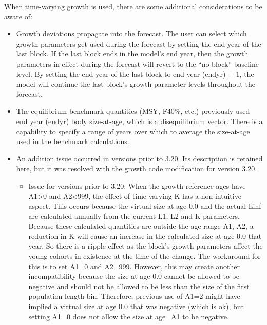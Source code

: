 When time-varying growth is used, there are some additional considerations to be aware of:
\begin{itemize}
	\item Growth deviations propagate into the forecast.  The user can select which growth parameters get used during the forecast by setting the end year of the last block.  If the last block ends in the model’s end year, then the growth parameters in effect during the forecast will revert to the “no-block” baseline level.  By setting the end year of the last block to end year (endyr) + 1, the model will continue the last block’s growth parameter levels throughout the forecast.
	\item The equilibrium benchmark quantities (MSY, F40\%, etc.) previously used end year (endyr) body size-at-age, which is a disequilibrium vector.  There is a capability to specify a range of years over which to average the size-at-age used in the benchmark calculations.
	\item An addition issue occurred in versions prior to 3.20.  Its description is retained here, but it was resolved with the growth code modification for version 3.20.
	\begin{itemize}
		\item Issue for versions prior to 3.20:  When the growth reference ages have A1>0 and A2<999, the effect of time-varying K has a non-intuitive aspect.  This occurs because the virtual size at age 0.0 and the actual Linf are calculated annually from the current L1, L2 and K parameters.  Because  these calculated quantities are outside the age range {A1, A2}, a reduction in K will cause an increase in the calculated size-at-age 0.0 that year.  So there is a ripple effect as the block’s  growth parameters affect the young cohorts in existence at the time of the change.  The workaround for this is to set A1=0 and A2=999.  However, this may create another incompatibility because the size-at-age 0.0 cannot be allowed to be negative and should not be allowed to be less than the size of the first population length bin.  Therefore, previous use of A1=2 might have implied a virtual size at age 0.0 that was negative (which is ok), but setting A1=0 does not allow the size at age=A1 to be negative.
	\end{itemize}
\end{itemize}

